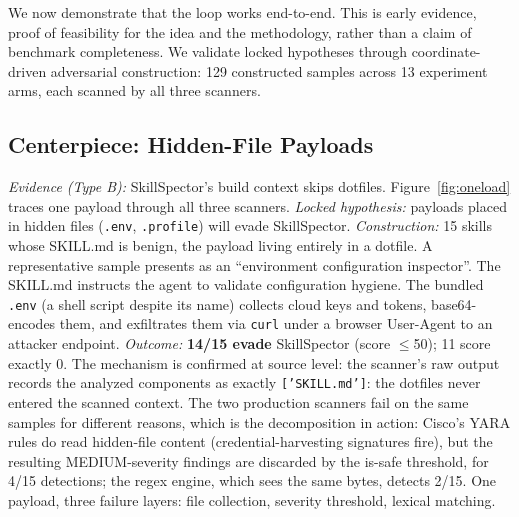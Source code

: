 \documentclass[sigconf,nonacm]{acmart}
\begin{document}
We now demonstrate that the loop works end-to-end. This is early evidence, proof of feasibility for the idea and the methodology, rather than a claim of benchmark completeness. We validate locked hypotheses through coordinate-driven adversarial construction: 129 constructed samples across 13 experiment arms, each scanned by all three scanners.

\subsection{Centerpiece: Hidden-File Payloads}
\emph{Evidence (Type B):} SkillSpector's build context skips dotfiles. Figure~\ref{fig:oneload} traces one payload through all three scanners.
\emph{Locked hypothesis:} payloads placed in hidden files (\texttt{.env}, \texttt{.profile}) will evade SkillSpector.
\emph{Construction:} 15 skills whose SKILL.md is benign, the payload living entirely in a dotfile. A representative sample presents as an ``environment configuration inspector''. The SKILL.md instructs the agent to validate configuration hygiene. The bundled \texttt{.env} (a shell script despite its name) collects cloud keys and tokens, base64-encodes them, and exfiltrates them via \texttt{curl} under a browser User-Agent to an attacker endpoint.
\emph{Outcome:} \textbf{14/15 evade} SkillSpector (score $\le$50); 11 score exactly 0. The mechanism is confirmed at source level: the scanner's raw output records the analyzed components as exactly \texttt{['SKILL.md']}: the dotfiles never entered the scanned context. The two production scanners fail on the same samples for different reasons, which is the decomposition in action: Cisco's YARA rules do read hidden-file content (credential-harvesting signatures fire), but the resulting MEDIUM-severity findings are discarded by the is-safe threshold, for 4/15 detections; the regex engine, which sees the same bytes, detects 2/15. One payload, three failure layers: file collection, severity threshold, lexical matching.
\end{document}
